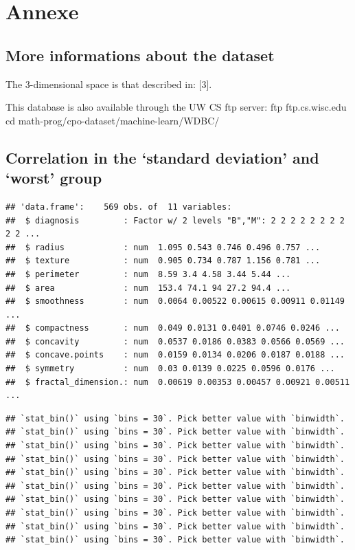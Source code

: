 \documentclass[
  11pt,
]{article}
\begin{document}
\hypertarget{annexe}{%
\section{Annexe}\label{annexe}}

\hypertarget{more-informations-about-the-dataset}{%
\subsection{More informations about the
dataset}\label{more-informations-about-the-dataset}}

The 3-dimensional space is that described in: {[}3{]}.

This database is also available through the UW CS ftp server: ftp
ftp.cs.wisc.edu cd math-prog/cpo-dataset/machine-learn/WDBC/

\hypertarget{correlation-in-the-standard-deviation-and-worst-group}{%
\subsection{Correlation in the `standard deviation' and `worst'
group}\label{correlation-in-the-standard-deviation-and-worst-group}}

\begin{verbatim}
## 'data.frame':    569 obs. of  11 variables:
##  $ diagnosis         : Factor w/ 2 levels "B","M": 2 2 2 2 2 2 2 2 2 2 ...
##  $ radius            : num  1.095 0.543 0.746 0.496 0.757 ...
##  $ texture           : num  0.905 0.734 0.787 1.156 0.781 ...
##  $ perimeter         : num  8.59 3.4 4.58 3.44 5.44 ...
##  $ area              : num  153.4 74.1 94 27.2 94.4 ...
##  $ smoothness        : num  0.0064 0.00522 0.00615 0.00911 0.01149 ...
##  $ compactness       : num  0.049 0.0131 0.0401 0.0746 0.0246 ...
##  $ concavity         : num  0.0537 0.0186 0.0383 0.0566 0.0569 ...
##  $ concave.points    : num  0.0159 0.0134 0.0206 0.0187 0.0188 ...
##  $ symmetry          : num  0.03 0.0139 0.0225 0.0596 0.0176 ...
##  $ fractal_dimension.: num  0.00619 0.00353 0.00457 0.00921 0.00511 ...
\end{verbatim}

\begin{verbatim}
## `stat_bin()` using `bins = 30`. Pick better value with `binwidth`.
## `stat_bin()` using `bins = 30`. Pick better value with `binwidth`.
## `stat_bin()` using `bins = 30`. Pick better value with `binwidth`.
## `stat_bin()` using `bins = 30`. Pick better value with `binwidth`.
## `stat_bin()` using `bins = 30`. Pick better value with `binwidth`.
## `stat_bin()` using `bins = 30`. Pick better value with `binwidth`.
## `stat_bin()` using `bins = 30`. Pick better value with `binwidth`.
## `stat_bin()` using `bins = 30`. Pick better value with `binwidth`.
## `stat_bin()` using `bins = 30`. Pick better value with `binwidth`.
## `stat_bin()` using `bins = 30`. Pick better value with `binwidth`.
\end{verbatim}
\end{document}
